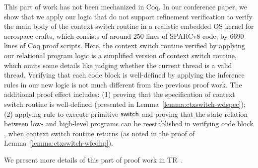 {This part of work has not been mechanized in Coq. 
In our conference paper, we show that 
we apply our logic that do not support 
refinement verification to verify 
the main body of the context switch routine in 
a realistic embedded OS kernel for aerospace crafts, 
which consists of around 250 lines of SPARCv8 code, 
by 6690 lines of Coq proof scripts. Here, the 
context switch routine verified by applying our 
relational program logic is a 
simplified version of context switch routine, 
which omits some details like judging whether the 
current thread is a valid thread. 
Verifying that each code block is well-defined 
by applying the inference rules in our new logic is 
not much different from the previous proof work. 
The additional proof effect includes: 
(1) proving that the specification of context 
switch routine is well-defined (presented in 
Lemma~\ref{lemma:ctxswitch-wdspec}); 
(2) applying  rule to execute 
primitive $\mathsf{switch}$ and proving that the state 
relation between low- and high-level programs 
can be reestablished in verifying code block 
\SwitchNewTask{}, when context switch routine 
returns (as noted in the proof of 
Lemma~\ref{lemma:ctxswitch-wfcdhp}). 

We present more details of this part of proof 
work in TR~\cite{coqimp}.
}
